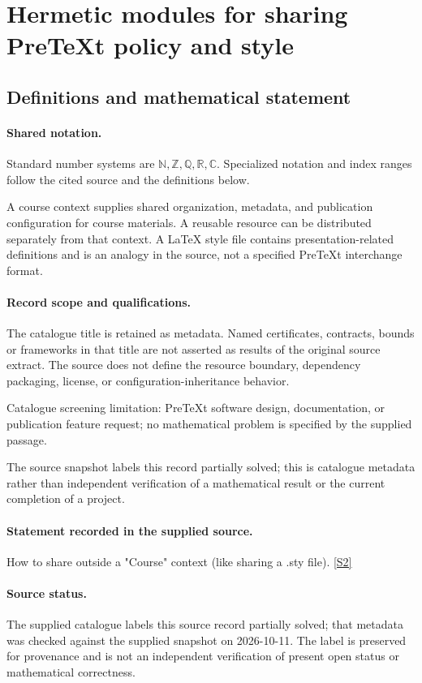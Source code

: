 \documentclass[11pt]{article}
\newcommand{\sref}[2]{\hyperlink{source:#1:#2}{[S#2]}}
\begin{document}
\section{Hermetic modules for sharing PreTeXt policy and style}\label{statement}

\subsection{Definitions and mathematical statement}

\paragraph{Shared notation.}Standard number systems are $\mathbb N,\mathbb Z,\mathbb Q,\mathbb R,\mathbb C$. Specialized notation and index ranges follow the cited source and the definitions below.


A course context supplies shared organization, metadata, and publication configuration for course materials. A reusable resource can be distributed separately from that context. A LaTeX style file contains presentation-related definitions and is an analogy in the source, not a specified PreTeXt interchange format.
\paragraph{Record scope and qualifications.}
The catalogue title is retained as metadata. Named certificates, contracts, bounds or frameworks in that title are not asserted as results of the original source extract.
The source does not define the resource boundary, dependency packaging, license, or configuration-inheritance behavior.

Catalogue screening limitation: PreTeXt software design, documentation, or publication feature request; no mathematical problem is specified by the supplied passage.

The source snapshot labels this record partially solved; this is catalogue metadata rather than independent verification of a mathematical result or the current completion of a project.
\paragraph{Statement recorded in the supplied source.}
How to share outside a "Course" context (like sharing a .sty file). \sref{statement}{2}
\paragraph{Source status.}
The supplied catalogue labels this source record partially solved; that metadata was checked against the supplied snapshot on 2026-10-11. The label is preserved for provenance and is not an independent verification of present open status or mathematical correctness.
\end{document}

